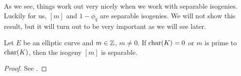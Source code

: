 As we see, things work out very nicely when we work with separable isogenies.
%
%
%
%
%	
%
Luckily for us, $[m]$ and $1 - \phi_q$ are separable isogenies. We will
not show this result, but it will turn out to be very important as we will see
later.


\begin{proposition}
	\label{prop:m-separable}
	Let $E$ be an elliptic curve and $m \in \mathbb{Z}$, $m \neq 0$.
	If $\operatorname{char}(K) = 0$ or $m$ is prime to $\operatorname{char}(K)$, then the
	isogeny $[m]$ is separable.
\end{proposition}
\begin{proof}
	See \cite[III.5.4]{silverman}.
\end{proof}

